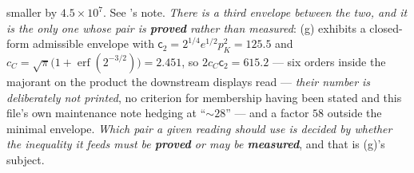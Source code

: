 smaller by $4.5\times10^{7}$. See 's note. \emph{There is a third envelope between the two, and it is the only one whose pair is \textbf{proved} rather than measured}: \textup{(g)} exhibits a closed-form admissible envelope with $\mathsf c_2=2^{1/4}e^{1/2}p_K^{2}=125.5$ and $c_C=\sqrt\pi\big(1+\operatorname{erf}(2^{-3/2})\big)=2.451$, so $2c_C\mathsf c_2=615.2$ --- six orders inside the majorant on the product the downstream displays read --- \emph{their number is deliberately not printed}, no criterion for membership having been stated and this file's own maintenance note hedging at ``$\sim28$'' --- and a factor $58$ outside the minimal envelope. \emph{Which pair a given reading should use is decided by whether the inequality it feeds must be \textbf{proved} or may be \textbf{measured}}, and that is \textup{(g)}'s subject.


